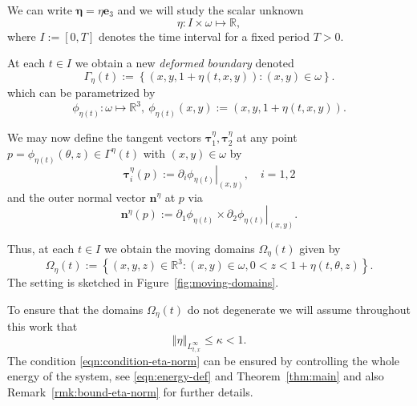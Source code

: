 \documentclass[10pt,a4paper]{article}
\numberwithin{equation}{section}
\begin{document}
We can write $\boldsymbol{\eta}=\eta \mathbf{e}_{3}$ and we will study  the scalar unknown
\[
\eta: I\times \omega \mapsto \mathbb{R},\]
where $I := [0,T]$ denotes the time interval for a fixed period $T > 0$.

At each $t\in I$ we obtain a new \emph{deformed boundary}  denoted 
\begin{equation}
\Gamma_{\eta}\left(t\right):=\left\{ \left(x,y,1+\eta\left(t,x,y\right)\right):\left(x,y\right)\in\omega\right\} .
\end{equation}
which can be parametrized by 
\begin{equation*}
\phi_{\eta\left(t\right)}:\omega\mapsto\mathbb{R}^{3},\ \phi_{\eta\left(t\right)}\left(x,y\right):=\left(x,y,1+\eta\left(t,x,y\right)\right).
\end{equation*}


We may now define the  tangent vectors $\boldsymbol{\tau}_{1}^{\eta},\boldsymbol{\tau}_{2}^{\eta}$ at any point $p=\phi_{\eta\left(t\right)}\left(\theta ,z\right)\in \Gamma ^{\eta}(t)$ with $(x,y)\in \omega$ by 
\begin{equation*}
\boldsymbol{\tau}_{i}^{\eta}\left(p\right):=\left.\partial_{i}\phi_{\eta\left(t\right)}\right|_{\left(x,y\right)},\quad i=1,2
\end{equation*}
and the  outer normal vector $\mathbf{n}^{\eta}$ at $p$ via 
\begin{equation*}
\mathbf{n}^{\eta}\left(p\right):=\left.\partial_{1}\phi_{\eta\left(t\right)}\times\partial_{2}\phi_{\eta\left(t\right)}\right|_{\left(x,y\right)}.
\end{equation*}

Thus, at each $t\in I$ we obtain the moving domains $\Omega_{\eta}\left(t\right)$ given
by
\begin{equation*}
\Omega_{\eta}\left(t\right):=\left\{ \left(x,y,z\right)\in\mathbb{R}^{3}:\left(x,y\right)\in\omega,0<z<1+\eta\left(t,\theta,z\right)\right\} .
\end{equation*}
 The setting is sketched in Figure~\ref{fig:moving-domains}.

To ensure that the domains $\Omega_{\eta}\left(t\right)$ do not degenerate 
we  will assume  throughout this work that 
\begin{equation}\label{eqn:condition-eta-norm}
\left\Vert \eta\right\Vert _{L_{t,x}^{\infty}}\le \kappa<1.
\end{equation}
The condition \eqref{eqn:condition-eta-norm} can be ensured by controlling the whole energy of the system, see \eqref{eqn:energy-def} and Theorem~\ref{thm:main} and also Remark~\ref{rmk:bound-eta-norm} for further details.
\end{document}
